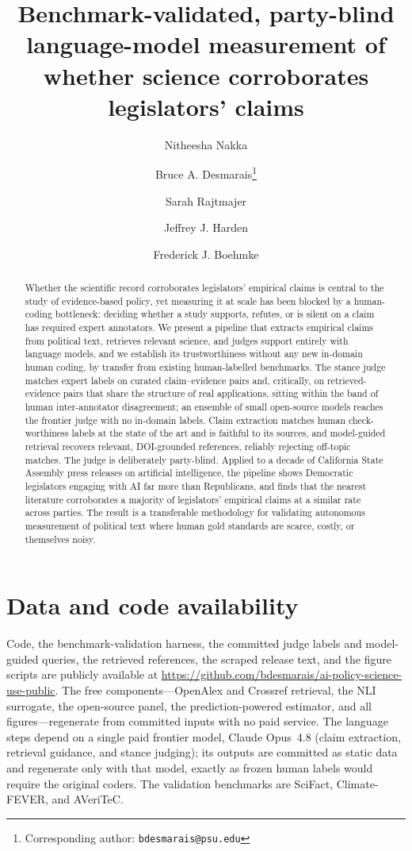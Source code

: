 \documentclass[11pt]{article}
\title{\textbf{Benchmark-validated, party-blind language-model measurement of
whether science corroborates legislators' claims}}
\author[1]{Nitheesha Nakka}
\author[2]{Bruce A. Desmarais\thanks{Corresponding author: \texttt{bdesmarais@psu.edu}}}
\author[3]{Sarah Rajtmajer}
\author[4]{Jeffrey J. Harden}
\author[5]{Frederick J. Boehmke}
\affil[1]{Princeton University}
\affil[2]{Department of Political Science, The Pennsylvania State University}
\affil[3]{College of Information Sciences and Technology, The Pennsylvania State University}
\affil[4]{Department of Political Science, University of Notre Dame}
\affil[5]{Department of Political Science, University of Iowa}
\date{}
\begin{document}
\maketitle

\begin{abstract}
\noindent
Whether the scientific record corroborates legislators' empirical claims is central to the study of
evidence-based policy, yet measuring it at scale has been blocked by a human-coding bottleneck: deciding
whether a study supports, refutes, or is silent on a claim has required expert annotators. We present a
pipeline that extracts empirical claims from political text, retrieves relevant science, and judges
support entirely with language models, and we establish its trustworthiness without any new in-domain
human coding, by transfer from existing human-labelled benchmarks. The stance judge matches expert labels
on curated claim--evidence pairs and, critically, on retrieved-evidence pairs that share the structure of
real applications, sitting within the band of human inter-annotator disagreement; an ensemble of small
open-source models reaches the frontier judge with no in-domain labels. Claim extraction matches human
check-worthiness labels at the state of the art and is faithful to its sources, and model-guided retrieval
recovers relevant, DOI-grounded references, reliably rejecting off-topic matches. The
judge is deliberately party-blind. Applied to a decade of California State Assembly press releases on
artificial intelligence, the pipeline shows Democratic legislators engaging with AI far more than
Republicans, and finds that the nearest literature corroborates a majority of legislators' empirical
claims at a similar rate across parties. The result is
a transferable methodology for validating autonomous measurement of political text where human gold
standards are scarce, costly, or themselves noisy.
\end{abstract}






\section*{Data and code availability}
Code, the benchmark-validation harness, the committed judge labels and model-guided queries, the retrieved
references, the scraped release text, and the figure scripts are publicly available at
\url{https://github.com/bdesmarais/ai-policy-science-use-public}. The free
components---OpenAlex and Crossref retrieval, the NLI surrogate, the open-source panel, the
prediction-powered estimator, and all figures---regenerate from committed inputs with no paid service. The
language steps depend on a single paid frontier model, Claude Opus~4.8 (claim extraction, retrieval guidance,
and stance judging); its outputs are committed as static data and regenerate only with that model, exactly
as frozen human labels would require the original coders. The validation benchmarks are SciFact,
Climate-FEVER, and AVeriTeC.
\end{document}
